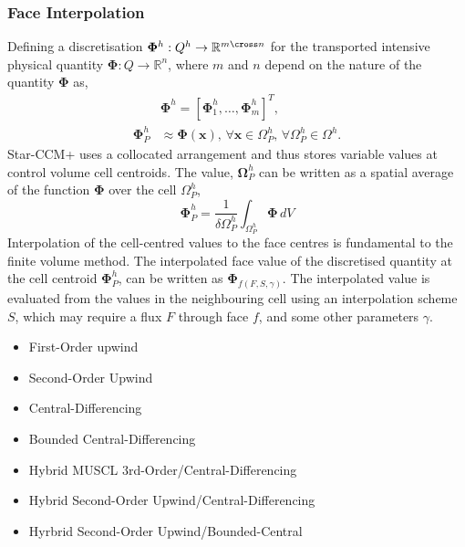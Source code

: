 \subsubsection{Face Interpolation}\label{subsec_interpolation}
Defining a discretisation $\mathbf{\Phi}^{h}: Q^{h} \to \mathbb{R}^{m \cross n}$ for the transported intensive physical quantity 
$\mathbf{\Phi}: Q \to \mathbb{R}^{n}$, where $m$ and $n$ depend on the nature of the quantity $\mathbf{\Phi}$ as,
\begin{align*}
    &\mathbf{\Phi}^{h} = [\mathbf{\Phi}_{1}^{h},\dots,\mathbf{\Phi}_{m}^{h}]^T,\\
    \mathbf{\Phi}_{P}^{h} &\approx \mathbf{\Phi}(\mathbf{x}),\,\forall \mathbf{x} \in \Omega^{h}_{P},\,\forall \Omega_{P}^{h} \in \Omega^{h}.
\end{align*} 
Star-CCM+ uses a collocated arrangement and thus stores variable values at control volume cell centroids. The value, $\mathbf{\Omega}_{P}^{h}$ can be written as a
spatial average of the function $\mathbf{\Phi}$ over the cell $\Omega_{P}^{h}$,
\begin{equation*}
    \mathbf{\Phi}_{P}^{h} = \frac{1}{\delta \Omega_{P}^{h}}\int_{\Omega_{P}^{h}}\mathbf{\Phi}\,dV
\end{equation*}
Interpolation of the cell-centred values to the face centres is fundamental to the finite volume method. The interpolated face value of the 
discretised quantity at the cell centroid $\mathbf{\Phi}_{P}^{h}$, can be written as $\mathbf{\Phi}_{f(F,S,\gamma)}$. The interpolated value is evaluated from 
the values in the neighbouring cell using an interpolation scheme $S$, which may require a flux $F$ through face $f$, and some other parameters $\gamma$.
\begin{itemize}
    \item First-Order upwind
    \item Second-Order Upwind
    \item Central-Differencing
    \item Bounded Central-Differencing
    \item Hybrid MUSCL 3rd-Order/Central-Differencing
    \item Hybrid Second-Order Upwind/Central-Differencing
    \item Hyrbrid Second-Order Upwind/Bounded-Central
\end{itemize}
